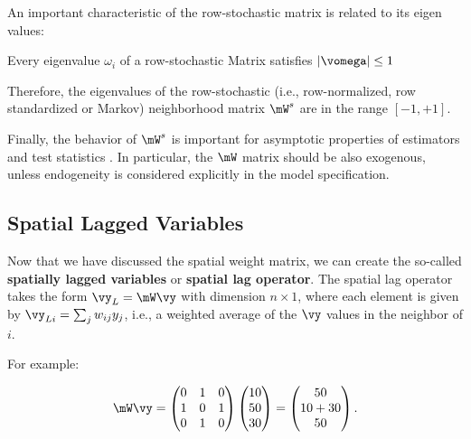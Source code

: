 \documentclass[english,12pt]{book}\usepackage[]{graphicx}\usepackage[]{xcolor}
\begin{document}
An important characteristic of the row-stochastic matrix is related to its eigen values:


\begin{theorem}\label{teo:eigen_values}
	Every eigenvalue $\omega_i$ of a row-stochastic Matrix satisfies $\left|\vomega\right|\leq 1$
\end{theorem}

Therefore, the eigenvalues of the row-stochastic (i.e., row-normalized, row standardized or Markov) neighborhood matrix $\mW^s$ are in the range $\left[-1, +1\right]$.

Finally, the behavior of $\mW^s$ is important for asymptotic properties of estimators and test statistics \citep[][pp. 244]{AnselinBera1998}. In particular, the $\mW$ matrix should be also exogenous, unless endogeneity is considered explicitly in the model specification. 

\subsection{Spatial Lagged Variables}\label{sec:spatial_lag_var}

Now that we have discussed the spatial weight matrix, we can create the so-called \textbf{spatially lagged variables} or \textbf{spatial lag operator}. The spatial lag operator takes the form $\vy_L = \mW\vy$ with dimension $n \times 1$, where each element is given by $\vy_{Li} = \sum_{j}w_{ij}y_j$, i.e., a weighted average of the $\vy$ values in the neighbor of $i$.

For example:

\begin{equation*}
  \mW\vy =    \begin{pmatrix}
     0 & 1 & 0 \\
     1 & 0 & 1 \\
     0 & 1 & 0
  \end{pmatrix}
  \begin{pmatrix}
     10 \\
     50 \\
     30
  \end{pmatrix} =
  \begin{pmatrix}
     50 \\
     10 + 30 \\
     50
  \end{pmatrix}.
\end{equation*}
\end{document}
